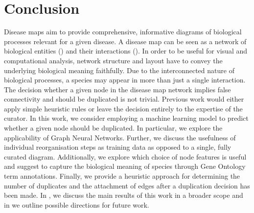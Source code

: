 \documentclass[
	fontsize=10pt, %
	twoside=true, %
	secnumdepth=1, %
  toc=indentunnumbered %
]{kaobook}
\begin{document}



\chapter{Conclusion}
\label{sec:conclusion}

Disease maps aim to provide comprehensive, informative diagrams of biological
processes relevant for a given disease. A disease map can be seen as a network
of biological entities () and their interactions ().
In order to be useful for visual and computational analysis, network structure
and layout have to convey the underlying biological meaning faithfully. Due to
the interconnected nature of biological processes, a species may appear in more
than just a single interaction.
%
The decision whether a given node in the disease map network implies false
connectivity and should be duplicated is not trivial. Previous work would either
apply simple heuristic rules or leave the decision entirely to the expertise of
the curator. In this work, we consider employing a machine learning model to
predict whether a given node should be duplicated. In particular, we explore the
applicability of Graph Neural Networks.
%
Further, we discuss the usefulness of individual reorganisation steps as
training data as opposed to a single, fully curated diagram. Additionally, we
explore which choice of node features is useful and suggest to capture the
biological meaning of species through Gene Ontology term annotations. Finally,
we provide a heuristic approach for determining the number of duplicates and the
attachment of edges after a duplication decision has been made. In
, we discuss the main results of this work in a broader scope
and in  we outline possible directions for future work.
\end{document}
